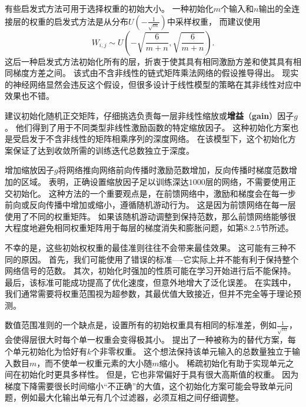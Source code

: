 有些启发式方法可用于选择权重的初始大小。
一种初始化$m$个输入和$n$输出的全连接层的权重的启发式方法是从分布$U(-\frac{1}{\sqrt{m}})$中采样权重，
而\cite{Glorot+al-AI-2011-small}建议使用
\begin{equation}
    W_{i,j} \sim U(-\sqrt{\frac{6}{m+n}}, \sqrt{\frac{6}{m+n}}) .
\end{equation}
这后一种启发式方法初始化所有的层，折衷于使其具有相同激励方差和使其具有相同梯度方差之间。
该式由不含非线性的链式矩阵乘法网络的假设推导得出。
现实的神经网络显然会违反这个假设，但很多设计于线性模型的策略在其非线性对应中效果也不错。


\cite{Saxe-et-al-ICLR13}建议初始化随机正交矩阵，仔细挑选负责每一层非线性缩放或\textbf{增益}（\textbf{gain}）因子$g$。
他们得到了用于不同类型非线性激励函数的特定缩放因子。
这种初始化方案也是受启发于不含非线性的矩阵相乘序列的深度网络。
在该模型下，这个初始化方案保证了达到收敛所需的训练迭代总数独立于深度。

增加缩放因子$g$将网络推向网络前向传播时激励范数增加，反向传播时梯度范数增加的区域。
\cite{Sussillo14}表明，正确设置缩放因子足以训练深达$1000$层的网络，不需要使用正交初始化。
这种方法的一个重要观点是，在前馈网络中，激励和梯度会在每一步前向或反向传播中增加或缩小，遵循随机游动行为。
这是因为前馈网络在每一层使用了不同的权重矩阵。
如果该随机游动调整到保持范数，那么前馈网络能够很大程度地避免相同权重矩阵用于每层的梯度消失和膨胀问题，如第8.2.5节所述。

不幸的是，这些初始权权重的最佳准则往往不会带来最佳效果。
这可能有三种不同的原因。
首先，我们可能使用了错误的标准----它实际上并不能有利于保持整个网络信号的范数。
其次，初始化时强加的性质可能在学习开始进行后不能保持。
最后，该标准可能成功提高了优化速度，但意外地增大了泛化误差。
在实践中，我们通常需要将权重范围视为超参数，其最优值大致接近，但并不完全等于理论预测。


数值范围准则的一个缺点是，设置所有的初始权重具有相同的标准差，例如$\frac{1}{\sqrt{m}}$，会使得层很大时每个单一权重会变得极其小。
\cite{martens2010hessian-small}提出了一种被称为的替代方案，每个单元初始化为恰好有$k$个非零权重。
这个想法保持该单元输入的总数量独立于输入数目$m$，而不使单一权重元素的大小随$m$缩小。
稀疏初始化有助于实现单元之间在初始化时更具多样性。
但是，它也非常偏好于具有很大高斯值的权重。
因为梯度下降需要很长时间缩小“不正确”的大值，这个初始化方案可能会导致单元问题，例如最大化输出单元有几个过滤器，必须互相之间仔细调整。

